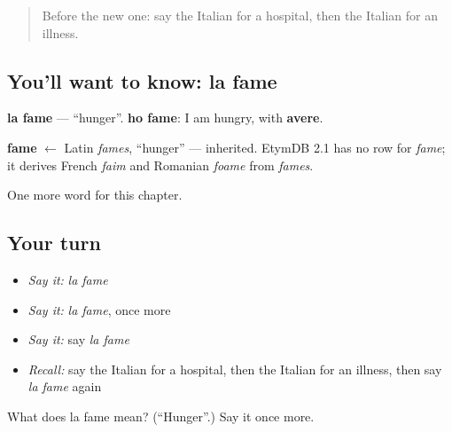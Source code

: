\begin{quote}
Before the new one: say the Italian for a hospital, then the Italian for an illness.
\end{quote}

\subsection*{You'll want to know: la fame}
\textbf{la fame} — \textquotedblleft{}hunger\textquotedblright{}. \textbf{ho fame}: I am hungry, with \textbf{avere}.

\begin{cousinweb}
\textbf{fame} $\leftarrow$ Latin \emph{fames}, \textquotedblleft{}hunger\textquotedblright{} — inherited. EtymDB 2.1 has no row for \emph{fame}; it derives French \emph{faim} and Romanian \emph{foame} from \emph{fames}.
\end{cousinweb}

\begin{grammarlens}[title={What you've built}]
One more word for this chapter.
\end{grammarlens}

\subsection*{Your turn}
\begin{itemize}
\raggedright
  \item \emph{Say it:} \emph{la fame}
  \item \emph{Say it:} \emph{la fame}, once more
  \item \emph{Say it:} say \emph{la fame}
  \item \emph{Recall:} say the Italian for a hospital, then the Italian for an illness, then say \emph{la fame} again
\end{itemize}

\begin{tcolorbox}[breakable,colback=teal!4,colframe=teal!35!black,title={Before you move on}]
What does la fame mean? (\textquotedblleft{}Hunger\textquotedblright{}.) Say it once more.
\end{tcolorbox}
